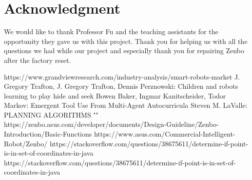 \documentclass[conference]{IEEEtran}
\begin{document}
\section*{Acknowledgment}
We would like to thank Professor Fu and the teaching assistants for the opportunity they gave us with this project.
Thank you for helping us with all the questions we had while our project and especially thank you for repairing Zenbo after the factory reset.\\
\begin{thebibliography}{00}
	 https://www.grandviewresearch.com/industry-analysis/smart-robots-market
	 J. Gregory Trafton, J. Gregory Trafton, Dennis Perznowski: Children and robots learning to play hide and seek
	 Bowen Baker, Ingmar Kanitscheider, Todor Markov: Emergent Tool Use From Multi-Agent Autocurricula
	 Steven M. LaValle: PLANNING ALGORITHMS
	  ""
	 https://zenbo.asus.com/developer/documents/Design-Guideline/Zenbo-Introduction/Basic-Functions
	 https://www.asus.com/Commercial-Intelligent-Robot/Zenbo/
	 https://stackoverflow.com/questions/38675611/determine-if-point-is-in-set-of-coordinates-in-java
	 https://stackoverflow.com/questions/38675611/determine-if-point-is-in-set-of-coordinates-in-java
\end{thebibliography}
\vspace{12pt}
\end{document}
